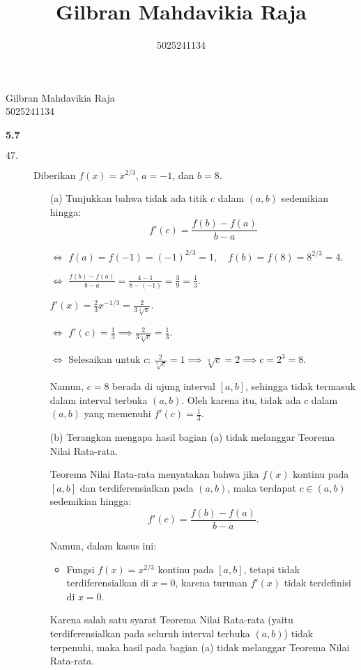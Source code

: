 \documentclass{article}
\title{Gilbran Mahdavikia Raja}
\author{5025241134}
\begin{document}
\begin{flushleft}
    Gilbran Mahdavikia Raja \\
    5025241134 \\
\end{flushleft}
{\Large \textbf{5.7}}
\begin{description}
    \item[$47.$] 
    Diberikan \( f(x) = x^{2/3} \), \( a = -1 \), dan \( b = 8 \).
    
    \begin{itemize}
        \item[(a)] Tunjukkan bahwa tidak ada titik \( c \) dalam \( (a, b) \) sedemikian hingga:
        \[
        f'(c) = \frac{f(b) - f(a)}{b-a}
        \]

        \item[$\Leftrightarrow$] $
        f(a) = f(-1) = (-1)^{2/3} = 1, \quad f(b) = f(8) = 8^{2/3} = 4.
        $
        \item[$\Leftrightarrow$]
        $
            \frac{f(b) - f(a)}{b - a} = \frac{4 - 1}{8 - (-1)} = \frac{3}{9} = \frac{1}{3}.
        $
        \item[]$f'(x) = \frac{2}{3} x^{-1/3} = \frac{2}{3 \sqrt[3]{x}}.
        $
        \item[$\Leftrightarrow$]
        $
        f'(c) = \frac{1}{3} \implies \frac{2}{3 \sqrt[3]{c}} = \frac{1}{3}.
        $
        \item[$\Leftrightarrow$]Selesaikan untuk \( c \):
        $
        \frac{2}{\sqrt[3]{c}} = 1 \implies \sqrt[3]{c} = 2 \implies c = 2^3 = 8.
        $

        Namun, \( c = 8 \) berada di ujung interval \([a, b]\), sehingga tidak termasuk dalam interval terbuka \( (a, b) \). Oleh karena itu, tidak ada \( c \) dalam \( (a, b) \) yang memenuhi \( f'(c) = \frac{1}{3} \).


        \item[(b)] Terangkan mengapa hasil bagian (a) tidak melanggar Teorema Nilai Rata-rata.
        \item[] Teorema Nilai Rata-rata menyatakan bahwa jika $ f(x) $ kontinu pada $[a, b]$ dan terdiferensialkan pada $(a, b)$, maka terdapat $ c \in (a, b) $ sedemikian hingga:
        \[
        f'(c) = \frac{f(b) - f(a)}{b - a}.
        \]
        
        Namun, dalam kasus ini:
        \begin{itemize}
            \item Fungsi \( f(x) = x^{2/3} \) kontinu pada \([a, b]\), tetapi tidak terdiferensialkan di \( x = 0 \), karena turunan \( f'(x) \) tidak terdefinisi di \( x = 0 \).
        \end{itemize}
        
        Karena salah satu syarat Teorema Nilai Rata-rata (yaitu terdiferensialkan pada seluruh interval terbuka \((a, b)\)) tidak terpenuhi, maka hasil pada bagian (a) tidak melanggar Teorema Nilai Rata-rata.
        
    \end{itemize}
\end{description}
\end{document}
